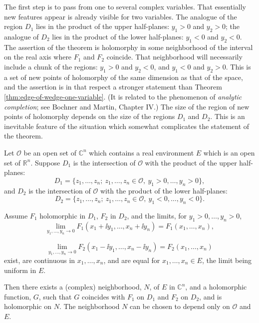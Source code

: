 The first step is to pass from one to several complex variables. That
essentially new features appear is already visible for two variables. The
analogue of the region $D_1$ lies in the product of the upper half-planes:
$y_1>0$ and $y_2>0$; the analogue of $D_2$ lies in the product of the lower
half-planes: $y_1<0$ and $y_2<0$. The assertion of the theorem is holomorphy
in some neighborhood of the interval on the real axis where $F_1$ and $F_2$
coincide. That neighborhood will necessarily include a chunk of the regions:
$y_1>0$ and $y_2<0$, and $y_1<0$ and $y_2>0$. This is a set of new points of
holomorphy of the same dimension as that of the space, and the assertion is in
that respect a stronger statement than Theorem \ref{thm:edge-of-wedge-one-variable}. (It is related to the
phenomenon of \emph{analytic completion}; see Bochner and Martin, Chapter IV.)
The size of the region of new points of holomorphy depends on the size of the
regions $D_1$ and $D_2$. This is an inevitable feature of the situation which
somewhat complicates the statement of the theorem.

\begin{theorem}\label{thm:edge-of-wedge-product-half-planes}
Let $\mathcal{O}$ be an open set of $\mathbb{C}^n$ which contains a real
environment $E$ which is an open set of $\mathbb{R}^n$. Suppose $D_1$ is the
intersection of $\mathcal{O}$ with the product of the upper half-planes:
\begin{equation}
  D_1=\{z_1,\ldots,z_n;\ z_1,\ldots,z_n\in\mathcal{O},\ y_1>0,\ldots,y_n>0\},
  \tag{2-96}\label{eq:ch2-edge-product-upper-domain}
\end{equation}
and $D_2$ is the intersection of $\mathcal{O}$ with the product of the lower
half-planes:
\begin{equation}
  D_2=\{z_1,\ldots,z_n;\ z_1,\ldots,z_n\in\mathcal{O},\ y_1<0,\ldots,y_n<0\}.
  \tag{2-97}\label{eq:ch2-edge-product-lower-domain}
\end{equation}

Assume $F_1$ holomorphic in $D_1$, $F_2$ in $D_2$, and the limits, for
$y_1>0,\ldots,y_n>0$,
\begin{equation}
  \lim_{y_1,\ldots,y_n\to0}
  F_1(x_1+\ii y_1,\ldots,x_n+\ii y_n)
  =F_1(x_1,\ldots,x_n),
  \tag{2-98}\label{eq:ch2-edge-product-upper-limit}
\end{equation}

\begin{equation}
  \lim_{y_1,\ldots,y_n\to0}
  F_2(x_1-\ii y_1,\ldots,x_n-\ii y_n)
  =F_2(x_1,\ldots,x_n)
  \tag{2-99}\label{eq:ch2-edge-product-lower-limit}
\end{equation}
exist, are continuous in $x_1,\ldots,x_n$, and are equal for
$x_1,\ldots,x_n\in E$, the limit being uniform in $E$.

Then there exists a (complex) neighborhood, $N$, of $E$ in $\mathbb{C}^n$,
and a holomorphic function, $G$, such that $G$ coincides with $F_1$ on $D_1$
and $F_2$ on $D_2$, and is holomorphic on $N$. The neighborhood $N$ can be
chosen to depend only on $\mathcal{O}$ and $E$.
\end{theorem}

